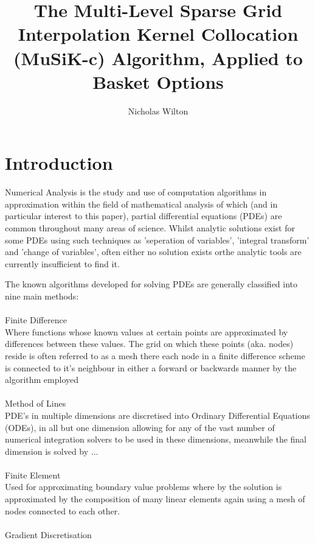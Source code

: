 \documentclass[a4paper]{amsart}
\begin{document}
\title[Multi-Level Sparse Grid Interpolation Kernel Collocation (MuSiKc)]
{The Multi-Level Sparse Grid Interpolation Kernel Collocation (MuSiK-c) Algorithm, Applied to Basket Options}
\author[NicholasWilton]{Nicholas Wilton}


\maketitle

\section{Introduction}

Numerical Analysis is the study and use of computation algorithms in approximation within the field of mathematical analysis of which (and in particular interest to this paper), partial differential equations (PDEs) are common throughout many areas of science. Whilst analytic solutions exist for some PDEs using such techniques as 'seperation of variables', 'integral transform' and 'change of variables', often either no solution exists orthe analytic tools are currently insufficient to find it.   

The known algorithms developed for solving PDEs are generally classified into nine main methods:\\
\\
\textperiodcentered Finite Difference\\
Where functions whose known values at certain points are approximated by differences between these values. The grid on which these points (aka. nodes) reside is often referred to as a mesh there each node in a finite difference scheme is connected to it's neighbour in either a forward or backwards manner by the algorithm employed\\
\\ 
\textperiodcentered Method of Lines\\
PDE's in multiple dimensions are discretised into Ordinary Differential Equations (ODEs), in all but one dimension allowing for any of the vast number of numerical integration solvers to be used in these dimensions, meanwhile the final dimension is solved by ...\\
\\ 
\textperiodcentered Finite Element\\
Used for approximating boundary value problems where by the solution is approximated by the composition of many linear elements again using a mesh of nodes connected to each other.\\
\\
\textperiodcentered Gradient Discretisation\\
\end{document}

